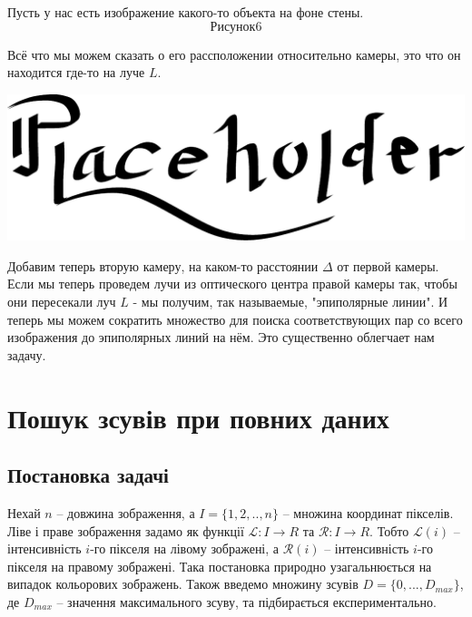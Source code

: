 	Пусть у нас есть изображение какого-то объекта на фоне стены.
	$$Рисунок 6$$
	
	Всё что мы можем сказать о его рассположении относительно камеры, это что он находится где-то на луче $L$.
	
	\includegraphics[scale = 0.75]{placeholder}
	
	Добавим теперь вторую камеру, на каком-то расстоянии $\Delta$ от первой камеры. Если мы теперь проведем лучи из оптического центра правой камеры так, чтобы они пересекали луч $L$ - мы получим, так называемые, "эпиполярные линии". И теперь мы можем сократить множество для поиска соответствующих пар со всего изображения до эпиполярных линий на нём. Это существенно облегчает нам задачу.

\section{Пошук зсувів при повних даних} \label{sec1}

\subsection{Постановка задачі} 
	Нехай $ n $ -- довжина зображення, а $I = \{1, 2, .., n\}$ -- множина координат пікселів. Ліве і праве зображення задамо як функції $ \mathcal{L} : I \rightarrow R $ та $ \mathcal{R} : I \rightarrow R $. Тобто $\mathcal{L}(i)$ -- інтенсивність $i$-го пікселя на лівому зображені, а $\mathcal{R}(i)$ -- інтенсивність $i$-го пікселя на правому зображені. Така постановка природно узагальнюється на випадок кольорових зображень. Також введемо множину зсувів $D = \{0, ... , D_{max}\}$, де $D_{max}$ -- значення максимального зсуву, та підбирається експериментально.


